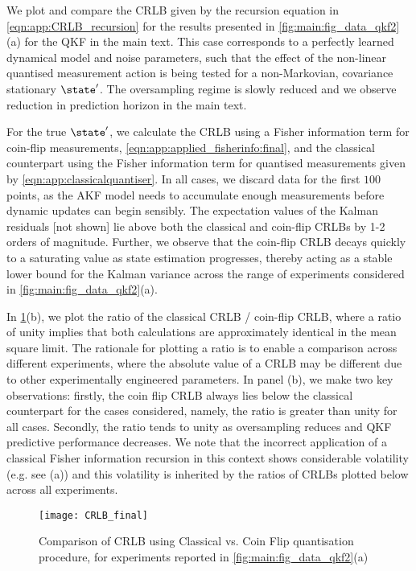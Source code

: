 We plot and compare the CRLB given by the recursion equation in \cref{eqn:app:CRLB_recursion} for the results presented in \cref{fig:main:fig_data_qkf2}(a)  for the QKF in the main text. This case corresponds to a perfectly learned dynamical model and noise parameters, such that the effect of the non-linear quantised measurement action is being tested for a non-Markovian, covariance stationary $\state'$. The oversampling regime is slowly reduced and we observe reduction in prediction horizon in the main text. 

For the true $\state'$, we calculate the CRLB using a Fisher information term for coin-flip measurements, \cref{eqn:app:applied_fisherinfo:final}, and the classical counterpart using the Fisher information term for quantised measurements given by \cref{eqn:app:classicalquantiser}. In all cases, we discard data for the first $100$ points, as the AKF model needs to accumulate enough measurements before dynamic updates can begin sensibly. The expectation values of the Kalman residuals [not shown] lie above both the classical and coin-flip CRLBs by 1-2 orders of magnitude. Further, we observe that the coin-flip CRLB decays quickly to a saturating value as state estimation progresses, thereby acting as a stable lower bound for the Kalman variance across the range of experiments considered in \cref{fig:main:fig_data_qkf2}(a).

In \cref{fig:app:CRLB}(b), we plot the ratio of the classical CRLB / coin-flip CRLB, where a ratio of unity implies that both calculations are approximately identical in the mean square limit. The rationale for plotting a ratio is to enable a comparison across different experiments, where the absolute value of a CRLB may be different due to other experimentally engineered parameters. In panel (b), we make two key observations: firstly, the coin flip CRLB always lies below the classical counterpart for the cases considered, namely, the ratio is greater than unity for all cases. Secondly, the ratio tends to unity as oversampling reduces and QKF predictive performance decreases. We note that the incorrect application of a classical Fisher information recursion in this context shows considerable volatility (e.g. see (a)) and this volatility is inherited by the ratios of CRLBs plotted below across all experiments.  

\begin{figure}[h!]
    \texttt{[image: CRLB\_final]} 
    \caption{ \label{fig:app:CRLB} Comparison of CRLB using Classical vs. Coin Flip quantisation procedure, for experiments reported in \cref{fig:main:fig_data_qkf2}(a) }
\end{figure}
\FloatBarrier


